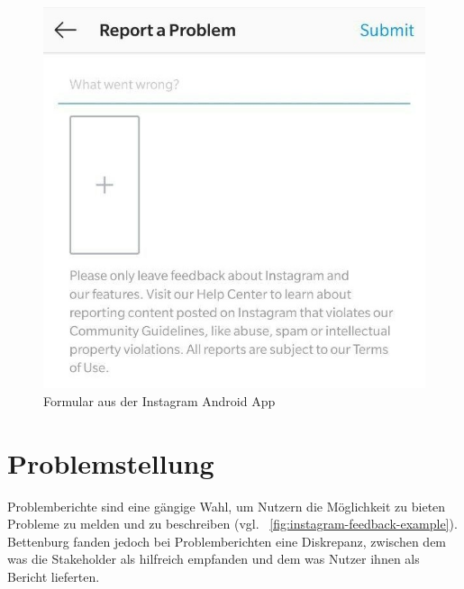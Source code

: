 
\begin{figure}
	\centering
	\vspace{-\baselineskip}
	\includegraphics[width=\linewidth]{img/instagram-feedback/instagram-feedback.jpg}
	\caption{Formular aus der Instagram \cite{Instagram} Android App}
	\label{fig:instagram-feedback-example}
\end{figure}

\section{Problemstellung}


Problemberichte sind eine gängige Wahl, um Nutzern die Möglichkeit zu bieten Probleme zu melden und zu beschreiben (vgl. ~\autoref{fig:instagram-feedback-example}). Bettenburg \etal \cite{WhatMakesAGoodBugReport} fanden jedoch bei Problemberichten eine Diskrepanz, zwischen dem was die Stakeholder als hilfreich empfanden und dem was Nutzer ihnen als Bericht lieferten.

